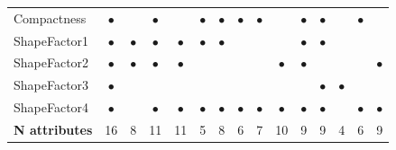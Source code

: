 \documentclass{beamer}
\begin{document}
\begin{frame}
{\begin{tabular}{||l|c|c|c|c|c|c|c|c|c|c|c|c|c|c||}
    Compactness & $\bullet$ & & $\bullet$ & & $\bullet$ & $\bullet$ & $\bullet$ & $\bullet$ & & $\bullet$ & $\bullet$ & & $\bullet$ & \\
    ShapeFactor1 & $\bullet$ & $\bullet$ & $\bullet$ & $\bullet$ & $\bullet$ & $\bullet$ & & & & $\bullet$ & $\bullet$ & & & \\
    ShapeFactor2 & $\bullet$ & $\bullet$ & $\bullet$ & $\bullet$ & & & & & $\bullet$ & $\bullet$ & & & & $\bullet$\\
    ShapeFactor3 & $\bullet$ & & & & & & & & & & $\bullet$ & $\bullet$ & & \\
	ShapeFactor4 & $\bullet$ & & $\bullet$ & $\bullet$ & $\bullet$ & $\bullet$ & $\bullet$ & $\bullet$ & $\bullet$ & $\bullet$ & $\bullet$ & & $\bullet$ & $\bullet$\\
    \hline
    \textbf{N attributes} & 16 & 8 & 11 & 11 & 5 & 8 & 6 & 7 & 10 & 9 & 9 & 4 & 6 & 9\\
    \hline
\end{tabular}
}
\end{frame}
\end{document}

